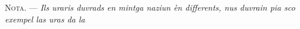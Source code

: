 %
%
%
%
%
%

\VUsaut{4.0mm}
\VUsaut{2.4mm}
\VUsaut{3.4mm}
\textsc{Nota.} --- \textit{Ils uraris duvrads en mintga naziun èn differents, nus
duvrain pia sco exempel las uras da la} 

